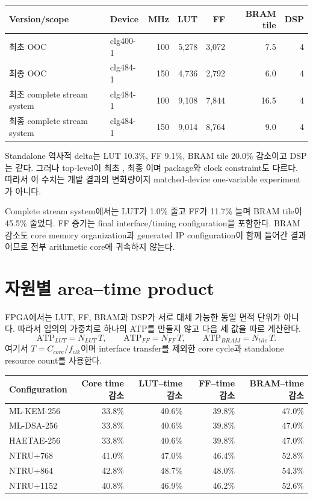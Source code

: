 \begin{longtable}{L{47mm}L{29mm}r r r r r}
\toprule
Version/scope & Device & MHz & LUT & FF & BRAM tile & DSP \\
\midrule
최초  OOC & clg400-1 & 100 & 5,278 & 3,072 & 7.5 & 4 \\
최종  OOC & clg484-1 & 150 & 4,736 & 2,792 & 6.0 & 4 \\
최초 complete stream system & clg484-1 & 100 & 9,108 & 7,844 & 16.5 & 4 \\
최종 complete stream system & clg484-1 & 150 & 9,014 & 8,764 & 9.0 & 4 \\
\bottomrule
\end{longtable}

Standalone 역사적 delta는 LUT 10.3\%, FF 9.1\%, BRAM tile 20.0\% 감소이고 DSP는
같다. 그러나 top-level이 최초 , 최종
이며 package와 clock constraint도 다르다. 따라서 이 수치는 개발
결과의 변화량이지 matched-device one-variable experiment가 아니다.

Complete stream system에서는 LUT가 1.0\% 줄고 FF가 11.7\% 늘며 BRAM tile이
45.5\% 줄었다. FF 증가는 final interface/timing configuration을 포함한다.
BRAM 감소도 core memory organization과 generated IP configuration이 함께 들어간
결과이므로 전부 arithmetic core에 귀속하지 않는다.

\section{자원별 area--time product}

FPGA에서는 LUT, FF, BRAM과 DSP가 서로 대체 가능한 동일 면적 단위가 아니다.
따라서 임의의 가중치로 하나의 ATP를 만들지 않고 다음 세 값을 따로 계산한다.
\[
\mathrm{ATP}_{LUT}=N_{LUT}\,T,\qquad
\mathrm{ATP}_{FF}=N_{FF}\,T,\qquad
\mathrm{ATP}_{BRAM}=N_{tile}\,T.
\]
여기서 $T=C_{core}/f_{clk}$이며 interface transfer를 제외한 core cycle과
standalone resource count를 사용한다.

\begin{longtable}{L{32mm}r r r r}
\toprule
Configuration & Core time 감소 & LUT--time 감소 & FF--time 감소 & BRAM--time 감소 \\
\midrule
ML-KEM-256 & 33.8\% & 40.6\% & 39.8\% & 47.0\% \\
ML-DSA-256 & 33.8\% & 40.6\% & 39.8\% & 47.0\% \\
HAETAE-256 & 33.8\% & 40.6\% & 39.8\% & 47.0\% \\
NTRU+768 & 41.0\% & 47.0\% & 46.4\% & 52.8\% \\
NTRU+864 & 42.8\% & 48.7\% & 48.0\% & 54.3\% \\
NTRU+1152 & 40.8\% & 46.9\% & 46.2\% & 52.6\% \\
\bottomrule
\end{longtable}

